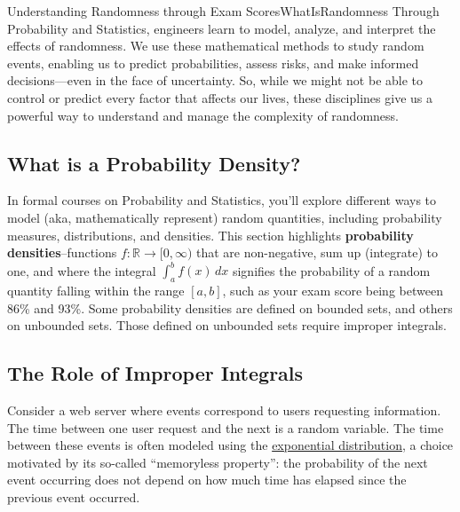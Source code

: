 \begin{funColor}{Understanding Randomness through Exam Scores}{WhatIsRandomness}
Through Probability and Statistics, engineers learn to model, analyze, and interpret the effects of randomness. We use these mathematical methods to study random events, enabling us to predict probabilities, assess risks, and make informed decisions—even in the face of uncertainty. So, while we might not be able to control or predict every factor that affects our lives, these disciplines give us a powerful way to understand and manage the complexity of randomness.
  
\end{funColor}

\subsection{What is a Probability Density?}

In formal courses on Probability and Statistics, you'll explore different ways to model (aka, mathematically represent) random quantities, including probability measures, distributions, and densities. This section highlights \textbf{probability densities}--functions \(f: \mathbb{R} \to [0, \infty)\) that are non-negative, sum up (integrate) to one, and where the integral \(\int_a^b f(x) \, dx\) signifies the probability of a random quantity falling within the range $[a, b]$, such as your exam score being between 86\% and 93\%. Some probability densities are defined on bounded sets, and others on unbounded sets. Those defined on unbounded sets require improper integrals.



\subsection{The Role of Improper Integrals}

Consider a web server where events correspond to users requesting information. The time between one user request and the next is a random variable. The time between these events is often modeled using the \href{https://en.wikipedia.org/wiki/Exponential_distribution}{exponential distribution}, a choice motivated by its so-called ``memoryless property'': the probability of the next event occurring does not depend on how much time has elapsed since the previous event occurred.

\bigskip

